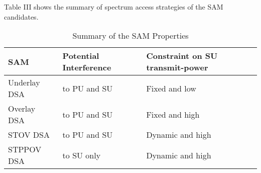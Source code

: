 \documentclass[journal,12pt,draftclsnofoot,onecolumn]{IEEEtran}
\newcommand{\mycomment}[1]{}
\begin{document}
Table III \mycomment{\ref{table:SAMCandSum}} shows the summary of spectrum access strategies of the SAM candidates. 
\begin{table}[htbp!]
\label{table:SAMCandSum}
\caption{Summary of the SAM Properties}
\centering
\begin{tabular}{lll}
\hline
SAM & Potential Interference & Constraint on SU transmit-power\\
\hline
Underlay DSA  & to PU and SU & Fixed and low\\
Overlay DSA & to PU and SU & Fixed and high\\
STOV DSA  & to PU and SU & Dynamic and high\\
STPPOV DSA  & to SU only & Dynamic and high\\
\hline
\end{tabular}
\end{table}
\end{document}
